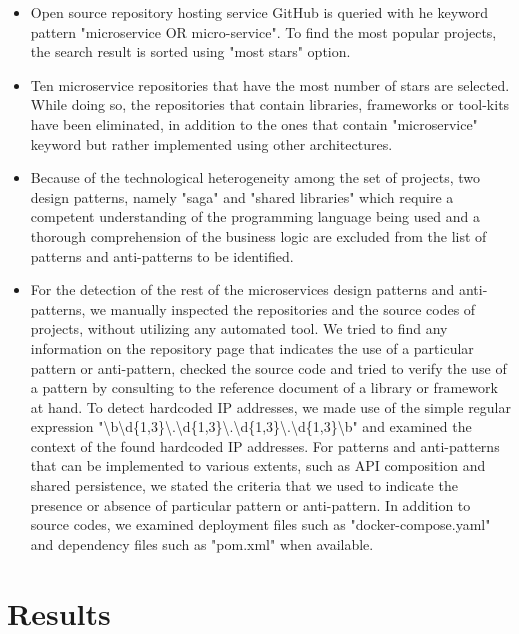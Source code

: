 \documentclass[11pt,a4paper,twocolumn]{article}
\begin{document}
\begin{itemize}
    \item Open source repository hosting service GitHub is queried with he keyword pattern "microservice OR micro-service". 
    To find the most popular projects, the search result is sorted using "most stars" option.

    \item Ten microservice repositories that have the most number of stars are selected.
    While doing so, the repositories that contain libraries, frameworks or tool-kits have been eliminated, in addition to the ones that contain "microservice" keyword but rather implemented using other architectures.
    
    \item Because of the technological heterogeneity among the set of projects, two design patterns, namely "saga" and "shared libraries" which require a competent understanding of the programming language being used and a thorough comprehension of the business logic are excluded from the list of patterns and anti-patterns to be identified.
    
    \item For the detection of the rest of the microservices design patterns and anti-patterns, we manually inspected the repositories and the source codes of projects, without utilizing any automated tool.
    We tried to find any information on the repository page that indicates the use of a particular pattern or anti-pattern, checked the source code and tried to verify the use of a pattern by consulting to the reference document of a library or framework at hand.
    To detect hardcoded IP addresses, we made use of the simple regular expression "\textbackslash b\textbackslash d\{1,3\}\textbackslash .\textbackslash d\{1,3\}\textbackslash .\textbackslash d\{1,3\}\textbackslash .\textbackslash d\{1,3\}\textbackslash b" and examined the context of the found hardcoded IP addresses.
    For patterns and anti-patterns that can be implemented to various extents, such as API composition and shared persistence, we stated the criteria that we used to indicate the presence or absence of particular pattern or anti-pattern.
    In addition to source codes, we examined deployment files such as "docker-compose.yaml" and dependency files such as "pom.xml" when available.
\end{itemize}

\section{Results}
\label{sec:result}
\end{document}
